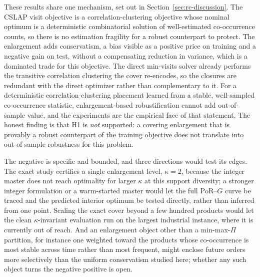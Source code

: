 \documentclass[preprint,review,11pt,authoryear]{elsarticle}
\begin{document}
These results share one mechanism, set out in Section~\ref{sec:rc-discussion}. The CSLAP visit objective is a correlation-clustering objective whose nominal optimum is a deterministic combinatorial solution of well-estimated co-occurrence counts, so there is no estimation fragility for a robust counterpart to protect. The enlargement adds conservatism, a bias visible as a positive price on training and a negative gain on test, without a compensating reduction in variance, which is a dominated trade for this objective. The direct min-visits solver already performs the transitive correlation clustering the cover re-encodes, so the closures are redundant with the direct optimizer rather than complementary to it. For a deterministic correlation-clustering placement learned from a stable, well-sampled co-occurrence statistic, enlargement-based robustification cannot add out-of-sample value, and the experiments are the empirical face of that statement. The honest finding is that H1 is \emph{not} supported: a covering enlargement that is provably a robust counterpart of the training objective does not translate into out-of-sample robustness for this problem.

The negative is specific and bounded, and three directions would test its edges. The exact study certifies a single enlargement level, $\kappa=2$, because the integer master does not reach optimality for larger $\kappa$ at this support diversity; a stronger integer formulation or a warm-started master would let the full $\mathrm{PoR}$--$G$ curve be traced and the predicted interior optimum be tested directly, rather than inferred from one point. Scaling the exact cover beyond a few hundred products would let the clean $\kappa$-invariant evaluation run on the largest industrial instance, where it is currently out of reach. And an enlargement object other than a min-max-$\Pi$ partition, for instance one weighted toward the products whose co-occurrence is most stable across time rather than most frequent, might enclose future orders more selectively than the uniform conservatism studied here; whether any such object turns the negative positive is open.

\end{document}
